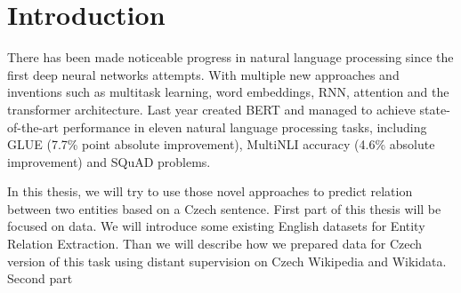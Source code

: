 \chapter*{Introduction}

There has been made noticeable progress in natural language processing since the first deep neural networks attempts. With multiple new approaches and  inventions such as multitask learning, word embeddings, RNN, attention and the transformer architecture.   Last year \cite{devlin2018bert} created BERT and managed to achieve state-of-the-art performance in eleven natural language processing tasks, including GLUE (7.7\% point absolute improvement), MultiNLI accuracy (4.6\% absolute improvement) and SQuAD problems.


In this thesis, we will try to use those novel approaches to predict relation between two entities based on a Czech sentence. First part of this thesis will be focused on data. We will  introduce some existing English datasets for Entity Relation Extraction. Than we will describe how we prepared data for Czech version of this task using distant supervision on Czech Wikipedia and Wikidata. Second part 


